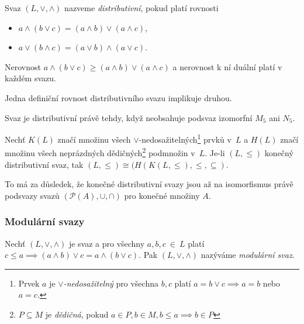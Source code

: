 \begin{definition}
    Svaz $(L, \vee, \wedge)$ nazveme {\em distributivní},
    pokud platí rovnosti
    \begin{itemize}
        \item $a \wedge (b \vee c) = (a \wedge b) \vee (a \wedge c)$,
        \item $a \vee (b \wedge c) = (a \vee b) \wedge (a \vee c)$.
    \end{itemize}
\end{definition}

\begin{claim}
    Nerovnost
    $a \wedge (b \vee c) \geq (a \wedge b) \vee (a \wedge c)$
    a nerovnost k ní duální
    platí v každém svazu.
\end{claim}

\begin{claim}
    Jedna definiční rovnost distributivního svazu implikuje druhou.
\end{claim}

\begin{claim}
    Svaz je distributivní právě tehdy, když neobsahuje podsvaz izomorfní
    $M_5$ ani $N_5$.
\end{claim}

\begin{theorem}
    Nechť $K(L)$ značí množinu všech $\vee$-nedosažitelných\footnote{
    Prvek $a$ je {\em $\vee$-nedosažitelný} pro všechna $b,c$ platí
    $a = b \vee c \implies a = b$ nebo $a = c$.} prvků v~$L$
    a $H(L)$ značí množinu všech neprázdných dědičných\footnote{
    $P \subseteq M$ je {\em dědičná}, pokud $a \in P, b \in M, b \leq a
    \implies b \in P$} podmnožin v~$L$.
    Je-li $(L, \leq)$ konečný distributivní svaz, tak
    $(L, \leq) \cong (H(K(L, \leq), \leq, \subseteq)$.
\end{theorem}

To má za důsledek, že
konečné distributivní svazy jsou až na isomorfismus právě podsvazy
svazů $(\mathcal{P}(A), \cup, \cap)$ pro konečné množiny $A$.

\subsubsection{Modulární svazy}

\begin{definition}
    Nechť $(L, \vee, \wedge)$ je svaz a pro všechny $a, b, c~\in~L$
    platí
    $c \leq a \implies (a \wedge b) \vee c = a \wedge (b \vee c)$.
    Pak $(L, \vee, \wedge)$ nazýváme {\em modulární svaz}.
\end{definition}

